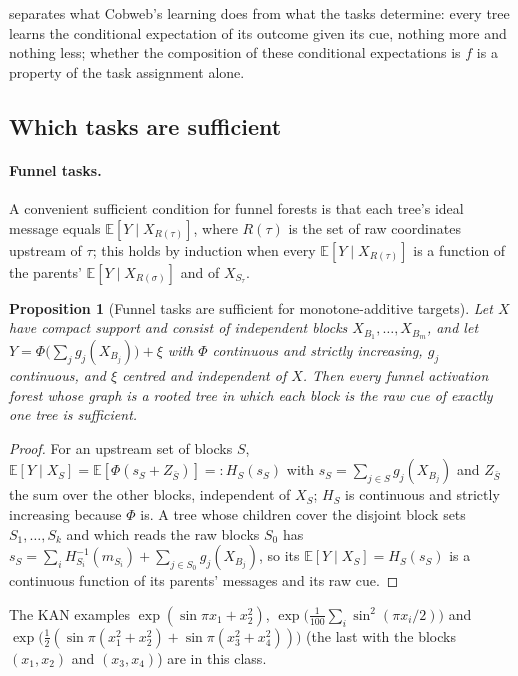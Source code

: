 \documentclass[11pt]{article}
\newtheorem{proposition}[theorem]{Proposition}
\theoremstyle{definition}
\theoremstyle{remark}
\newcommand{\E}{\mathbb{E}}
\begin{document}
 separates what Cobweb's learning does from what the tasks determine:
every tree learns the conditional expectation of its outcome given its cue, nothing more
and nothing less; whether the composition of these conditional expectations is $f$ is a
property of the task assignment alone.

\subsection{Which tasks are sufficient}

\paragraph{Funnel tasks.}
A convenient sufficient condition for funnel forests is that each tree's ideal message
equals $\E[Y\mid X_{R(\tau)}]$, where $R(\tau)$ is the set of raw coordinates upstream of
$\tau$; this holds by induction when every $\E[Y\mid X_{R(\tau)}]$ is a function of the
parents' $\E[Y\mid X_{R(\sigma)}]$ and of $X_{S_\tau}$.

\begin{proposition}[Funnel tasks are sufficient for monotone-additive targets]\label{prop:suffclass}
Let $X$ have compact support and consist of independent blocks $X_{B_1},\dots,X_{B_m}$, and let
$Y=\Phi\bigl(\sum_jg_j(X_{B_j})\bigr)+\xi$ with $\Phi$ continuous and strictly increasing,
$g_j$ continuous, and $\xi$ centred and independent of $X$.  Then every funnel
activation forest whose graph is a rooted tree in which each block is the raw cue of
exactly one tree is sufficient.
\end{proposition}
\begin{proof}
For an upstream set of blocks $S$, $\E[Y\mid X_S]=\E[\Phi(s_S+Z_{\bar S})]=:H_S(s_S)$ with
$s_S=\sum_{j\in S}g_j(X_{B_j})$ and $Z_{\bar S}$ the sum over the other blocks, independent
of $X_S$; $H_S$ is continuous and strictly increasing because $\Phi$ is.  A tree whose
children cover the disjoint block sets $S_1,\dots,S_k$ and which reads the raw blocks $S_0$
has $s_S=\sum_iH_{S_i}^{-1}(m_{S_i})+\sum_{j\in S_0}g_j(X_{B_j})$, so its
$\E[Y\mid X_S]=H_S(s_S)$ is a continuous function of its parents' messages and its raw
cue.
\end{proof}

The KAN examples $\exp(\sin\pi x_1+x_2^2)$, $\exp\bigl(\tfrac1{100}\sum_i\sin^2(\pi x_i/2)\bigr)$
and $\exp\bigl(\tfrac12(\sin\pi(x_1^2+x_2^2)+\sin\pi(x_3^2+x_4^2))\bigr)$ (the last with
the blocks $(x_1,x_2)$ and $(x_3,x_4)$) are in this class.
\end{document}
